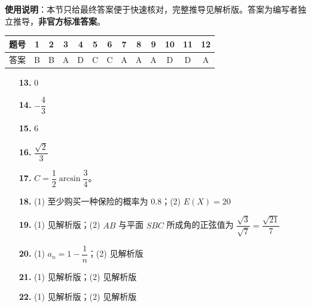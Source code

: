 
\begin{gknotice}
\textbf{使用说明}：本节只给最终答案便于快速核对，完整推导见解析版。答案为编写者独立推导，\textbf{非官方标准答案}。
\end{gknotice}

\begin{center}\begin{tabular}{ccccccccccccc}
\toprule
题号 & 1 & 2 & 3 & 4 & 5 & 6 & 7 & 8 & 9 & 10 & 11 & 12 \\
\midrule
答案 & B & B & A & D & C & C & A & A & A & D & D & A \\
\bottomrule
\end{tabular}\end{center}

\begin{itemize}[leftmargin=2.6em]
  \item[\textbf{13.}] $0$
  \item[\textbf{14.}] $-\dfrac43$
  \item[\textbf{15.}] $6$
  \item[\textbf{16.}] $\dfrac{\sqrt2}{3}$
\end{itemize}

\begin{itemize}[leftmargin=2.6em]
  \item[\textbf{17.}] $C=\dfrac12\arcsin\dfrac34$。
  \item[\textbf{18.}] (1) 至少购买一种保险的概率为 $0.8$；(2) $E(X)=20$
  \item[\textbf{19.}] (1) 见解析版；(2) $AB$ 与平面 $SBC$ 所成角的正弦值为 $\dfrac{\sqrt3}{\sqrt7}=\dfrac{\sqrt{21}}7$
  \item[\textbf{20.}] (1) $a_n=1-\dfrac1n$；(2) 见解析版
  \item[\textbf{21.}] (1) 见解析版；(2) 见解析版
  \item[\textbf{22.}] (1) 见解析版；(2) 见解析版
\end{itemize}
